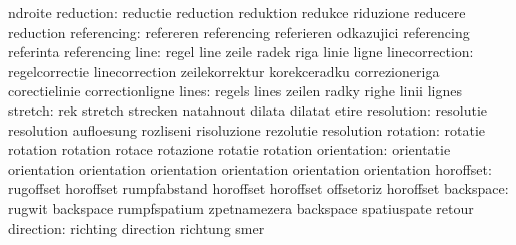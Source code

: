                            ndroite
                reduction: reductie                  reduction
                           reduktion                 redukce
                           riduzione                 reducere
                           reduction
              referencing: refereren                 referencing
                           referieren                odkazujici
                           referencing               referinta
                           referencing
                     line: regel                     line
                           zeile                     radek
                           riga                      linie
                           ligne
           linecorrection: regelcorrectie            linecorrection
                           zeilekorrektur            korekceradku
                           correzioneriga            corectielinie
                           correctionligne
                    lines: regels                    lines
                           zeilen                    radky
                           righe                     linii
                           lignes
                  stretch: rek                       stretch
                           strecken                  natahnout
                           dilata                    dilatat
                           etire
               resolution: resolutie                 resolution
                           aufloesung                rozliseni
                           risoluzione               rezolutie
                           resolution
                 rotation: rotatie                   rotation
                           rotation                  rotace
                           rotazione                 rotatie
                           rotation
              orientation: orientatie                orientation
                           orientation               orientation
                           orientation               orientation
                           orientation
                horoffset: rugoffset                 horoffset
                           rumpfabstand              horoffset
                           horoffset                 offsetoriz
                           horoffset
                backspace: rugwit                    backspace
                           rumpfspatium              zpetnamezera
                           backspace                 spatiuspate
                           retour
                direction: richting                  direction
                           richtung                  smer

